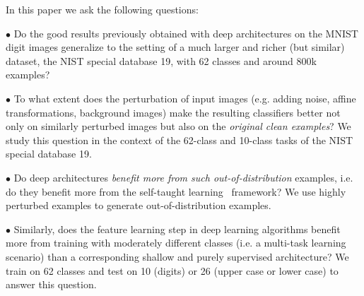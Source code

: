 \documentclass{article} %
\begin{document}

%
In this paper we ask the following questions:

$\bullet$ %
Do the good results previously obtained with deep architectures on the
MNIST digit images generalize to the setting of a much larger and richer (but similar)
dataset, the NIST special database 19, with 62 classes and around 800k examples?

$\bullet$ %
To what extent does the perturbation of input images (e.g. adding
noise, affine transformations, background images) make the resulting
classifiers better not only on similarly perturbed images but also on
the {\em original clean examples}? We study this question in the
context of the 62-class and 10-class tasks of the NIST special database 19.

$\bullet$ %
Do deep architectures {\em benefit more from such out-of-distribution}
examples, i.e. do they benefit more from the self-taught learning~\citep{RainaR2007} framework?
We use highly perturbed examples to generate out-of-distribution examples.

$\bullet$ %
Similarly, does the feature learning step in deep learning algorithms benefit more 
from training with moderately different classes (i.e. a multi-task learning scenario) than
a corresponding shallow and purely supervised architecture?
We train on 62 classes and test on 10 (digits) or 26 (upper case or lower case)
to answer this question.
\end{document}
